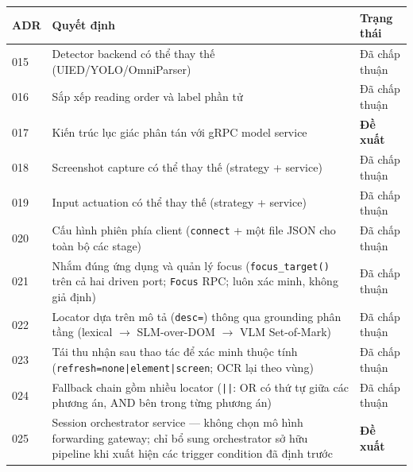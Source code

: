\documentclass[11pt,a4paper]{report}
\newcommand{\code}[1]{\texttt{#1}}
\begin{document}
\begin{longtable}{@{}p{1.4cm}p{7.8cm}p{2.4cm}@{}}
\toprule
\textbf{ADR} & \textbf{Quyết định} & \textbf{Trạng thái} \\
\midrule
\endhead
015 & Detector backend có thể thay thế (UIED/YOLO/OmniParser) & Đã chấp thuận \\
016 & Sắp xếp reading order và label phần tử & Đã chấp thuận \\
017 & Kiến trúc lục giác phân tán với gRPC model service & \textbf{Đề xuất} \\
018 & Screenshot capture có thể thay thế (strategy + service) & Đã chấp thuận \\
019 & Input actuation có thể thay thế (strategy + service) & Đã chấp thuận \\
020 & Cấu hình phiên phía client (\code{connect} + một file JSON cho toàn bộ các stage) & Đã chấp thuận \\
021 & Nhắm đúng ứng dụng và quản lý focus (\code{focus\_target()} trên cả hai driven port; \code{Focus} RPC; luôn xác minh, không giả định) & Đã chấp thuận \\
022 & Locator dựa trên mô tả (\code{desc=}) thông qua grounding phân tầng (lexical $\rightarrow$ SLM-over-DOM $\rightarrow$ VLM Set-of-Mark) & Đã chấp thuận \\
023 & Tái thu nhận sau thao tác để xác minh thuộc tính (\code{refresh=none|element|screen}; OCR lại theo vùng) & Đã chấp thuận \\
024 & Fallback chain gồm nhiều locator (\code{||}: OR có thứ tự giữa các phương án, AND bên trong từng phương án) & Đã chấp thuận \\
025 & Session orchestrator service --- không chọn mô hình forwarding gateway; chỉ bổ sung orchestrator sở hữu pipeline khi xuất hiện các trigger condition đã định trước & \textbf{Đề xuất} \\
\bottomrule
\end{longtable}
\end{document}
